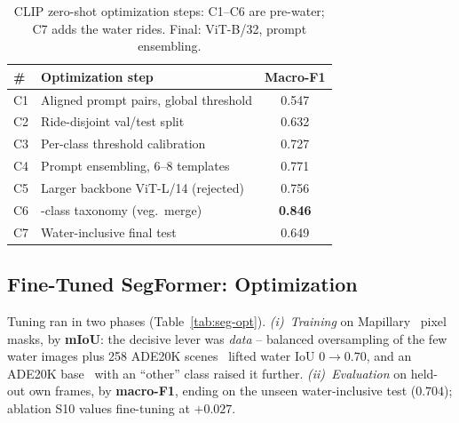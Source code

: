 \documentclass[letterpaper,journal]{IEEEtran}
\begin{document}
\begin{table}[H]
\caption{CLIP zero-shot optimization steps: C1--C6 are
pre-water; C7 adds the water rides. Final: ViT-B/32, prompt ensembling.}
\label{tab:clip-opt}
\centering
\scriptsize
\setlength{\tabcolsep}{3pt}
\renewcommand{\arraystretch}{1.0}
\begin{tabular}{@{}p{}>{\raggedright\arraybackslash}p{}c@{}}
\toprule
\textbf{\#} & \textbf{Optimization step} & \textbf{Macro-F1}\\
\midrule
C1 & Aligned prompt pairs, global threshold & 0.547\\
C2 & Ride-disjoint val/test split & 0.632\\
C3 & Per-class threshold calibration & 0.727\\
C4 & Prompt ensembling, 6--8 templates & 0.771\\
C5 & Larger backbone ViT-L/14 (rejected) & 0.756\\
C6 & 3-class taxonomy (veg.\ merge) & \textbf{0.846}\\
\midrule
C7 & Water-inclusive final test & 0.649\\
\bottomrule
\end{tabular}
\end{table}

\subsection{Fine-Tuned SegFormer: Optimization}
Tuning ran in two phases (Table~\ref{tab:seg-opt}). \emph{(i)~Training} on
Mapillary~\cite{mapillaryvistas} pixel masks, by \textbf{mIoU}: the decisive lever was
\emph{data} -- balanced oversampling of the few water images plus 258 ADE20K
scenes~\cite{ade20k} lifted
water IoU $0\!\to\!0.70$, and an ADE20K base~\cite{ftsegformer} with an ``other'' class
raised it further. \emph{(ii)~Evaluation} on held-out own frames, by \textbf{macro-F1},
ending on the unseen water-inclusive test ($0.704$); ablation S10 values fine-tuning at
$+0.027$.
\end{document}

